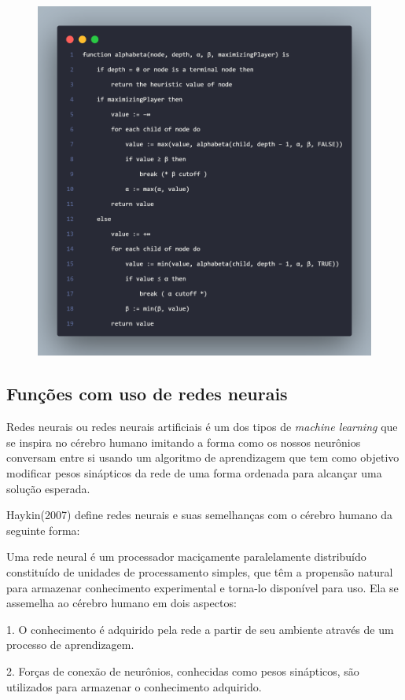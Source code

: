 \begin{figure}[!ht]
    \centering
    \label{alphabeta-code}
    \includegraphics[scale=0.25]{figuras/alphabeta.png}
\end{figure}

\subsection{Funções com uso de redes neurais}

Redes neurais ou redes neurais artificiais é um dos tipos de \textit{machine learning} que se inspira no cérebro
humano imitando a forma como os nossos neurônios conversam entre si usando um algoritmo de aprendizagem
que tem como objetivo modificar pesos sinápticos da rede de uma forma ordenada para alcançar uma solução esperada.

Haykin(2007) define redes neurais e suas semelhanças com o cérebro humano da seguinte forma:
\begin{citacao}
    Uma rede neural é um processador maciçamente paralelamente distribuído constituído de unidades de processamento simples,
    que têm a propensão natural para armazenar conhecimento experimental e torna-lo disponível para uso. Ela se assemelha ao cérebro humano
    em dois aspectos:

    1. O conhecimento é adquirido pela rede a partir de seu ambiente através de um processo de aprendizagem.

    2. Forças de conexão de neurônios, conhecidas como pesos sinápticos, são utilizados para armazenar o conhecimento adquirido.
    \cite[p.28, tradução por Paulo Martins Engel]{HAYKIN}
\end{citacao}

